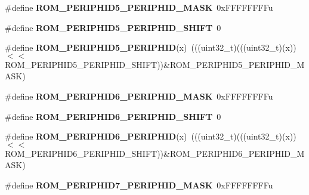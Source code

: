 \begin{DoxyCompactItemize}
\#define {\bfseries R\+O\+M\+\_\+\+P\+E\+R\+I\+P\+H\+I\+D5\+\_\+\+P\+E\+R\+I\+P\+H\+I\+D\+\_\+\+M\+A\+SK}~0x\+F\+F\+F\+F\+F\+F\+F\+Fu
\item 
\mbox{\label{group___r_o_m___register___masks_ga083194b41cf1109fe5a6e235b2c1f89a}} 
\#define {\bfseries R\+O\+M\+\_\+\+P\+E\+R\+I\+P\+H\+I\+D5\+\_\+\+P\+E\+R\+I\+P\+H\+I\+D\+\_\+\+S\+H\+I\+FT}~0
\item 
\mbox{\label{group___r_o_m___register___masks_gaa801210cd537086eddf2456575251d93}} 
\#define {\bfseries R\+O\+M\+\_\+\+P\+E\+R\+I\+P\+H\+I\+D5\+\_\+\+P\+E\+R\+I\+P\+H\+ID}(x)~(((uint32\+\_\+t)(((uint32\+\_\+t)(x))$<$$<$R\+O\+M\+\_\+\+P\+E\+R\+I\+P\+H\+I\+D5\+\_\+\+P\+E\+R\+I\+P\+H\+I\+D\+\_\+\+S\+H\+I\+FT))\&R\+O\+M\+\_\+\+P\+E\+R\+I\+P\+H\+I\+D5\+\_\+\+P\+E\+R\+I\+P\+H\+I\+D\+\_\+\+M\+A\+SK)
\item 
\mbox{\label{group___r_o_m___register___masks_gae29765428defa80237980d34b67f4fde}} 
\#define {\bfseries R\+O\+M\+\_\+\+P\+E\+R\+I\+P\+H\+I\+D6\+\_\+\+P\+E\+R\+I\+P\+H\+I\+D\+\_\+\+M\+A\+SK}~0x\+F\+F\+F\+F\+F\+F\+F\+Fu
\item 
\mbox{\label{group___r_o_m___register___masks_ga0cb9b85e1ca798d1897bcef6afce8a79}} 
\#define {\bfseries R\+O\+M\+\_\+\+P\+E\+R\+I\+P\+H\+I\+D6\+\_\+\+P\+E\+R\+I\+P\+H\+I\+D\+\_\+\+S\+H\+I\+FT}~0
\item 
\mbox{\label{group___r_o_m___register___masks_gacd2a1a4b870a765537be3a9aaae25cba}} 
\#define {\bfseries R\+O\+M\+\_\+\+P\+E\+R\+I\+P\+H\+I\+D6\+\_\+\+P\+E\+R\+I\+P\+H\+ID}(x)~(((uint32\+\_\+t)(((uint32\+\_\+t)(x))$<$$<$R\+O\+M\+\_\+\+P\+E\+R\+I\+P\+H\+I\+D6\+\_\+\+P\+E\+R\+I\+P\+H\+I\+D\+\_\+\+S\+H\+I\+FT))\&R\+O\+M\+\_\+\+P\+E\+R\+I\+P\+H\+I\+D6\+\_\+\+P\+E\+R\+I\+P\+H\+I\+D\+\_\+\+M\+A\+SK)
\item 
\mbox{\label{group___r_o_m___register___masks_ga46d62ff696136480044fa6bd78597be6}} 
\#define {\bfseries R\+O\+M\+\_\+\+P\+E\+R\+I\+P\+H\+I\+D7\+\_\+\+P\+E\+R\+I\+P\+H\+I\+D\+\_\+\+M\+A\+SK}~0x\+F\+F\+F\+F\+F\+F\+F\+Fu
\item 
\mbox{\label{group___r_o_m___register___masks_ga660f3354bf252cb5c5a72b828ba683bd}} 

\end{DoxyCompactItemize}

